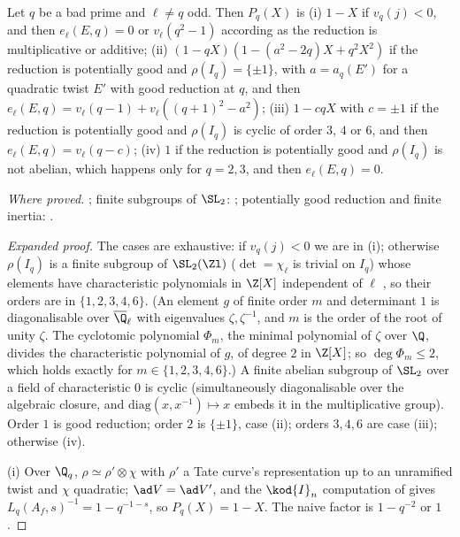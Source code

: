 \begin{sloppypar}
\begin{proposition}\label{prop:paper:shapes}
Let $q$ be a bad prime and $\ell\ne q$ odd. Then $P_q(X)$ is (i) $1-X$ if $v_q(j)<0$, and then $e_\ell(E,q)=0$ or $v_\ell(q^2-1)$ according as the reduction is multiplicative or
additive; (ii) $(1-qX)(1-(a^2-2q)X+q^2X^2)$ if the reduction is potentially good and $\rho(I_q)=\{\pm1\}$, with $a=a_q(E')$ for a quadratic twist $E'$ with good reduction at
$q$, and then $e_\ell(E,q)=v_\ell(q-1)+v_\ell((q+1)^2-a^2)$; (iii) $1-cqX$ with $c=\pm1$ if the reduction is potentially good and $\rho(I_q)$ is cyclic of order $3$, $4$ or $6$, and
then $e_\ell(E,q)=v_\ell(q-c)$; (iv) $1$ if the reduction is potentially good and $\rho(I_q)$ is not abelian, which happens only for $q=2,3$, and then $e_\ell(E,q)=0$.
\end{proposition}

\noindent\emph{Where proved.} ; finite subgroups of $\SL_2$: ; potentially good reduction and finite inertia: .

\begin{proof}[Expanded proof]
The cases are exhaustive: if $v_q(j)<0$ we are in (i); otherwise $\rho(I_q)$ is a finite subgroup of $\SL_2(\Zl)$ ($\det=\chi_\ell$ is trivial on $I_q$) whose elements have
characteristic polynomials in $\Z[X]$ independent of $\ell$ \cite[Section 2]{SerreTate68}, so their orders are in $\{1,2,3,4,6\}$. (An element $g$ of finite order $m$ and determinant $1$ is diagonalisable over
$\overline\Q_\ell$ with eigenvalues $\zeta,\zeta^{-1}$, and $m$ is the order of the root of unity $\zeta$. The cyclotomic polynomial $\Phi_m$, the minimal polynomial of $\zeta$ over $\Q$, divides the
characteristic polynomial of $g$, of degree $2$ in $\Z[X]$; so $\deg\Phi_m\le2$, which holds exactly for $m\in\{1,2,3,4,6\}$.) A finite abelian subgroup of $\SL_2$ over a field of
characteristic $0$ is cyclic (simultaneously diagonalisable over the algebraic closure, and $\mathrm{diag}(x,x^{-1})\mapsto x$ embeds it in the multiplicative group). Order $1$ is good
reduction; order $2$ is $\{\pm1\}$, case (ii); orders $3,4,6$ are case (iii); otherwise (iv).

(i) Over $\Q_q$, $\rho\simeq\rho'\otimes\chi$ with $\rho'$ a Tate curve's representation up to an unramified twist and $\chi$ quadratic; $\ad V=\ad V'$, and the $\kod{I}_n$ computation of
 gives $L_q(A_f,s)^{-1}=1-q^{-1-s}$, so $P_q(X)=1-X$. The naive factor is $1-q^{-2}$ or $1$.


\end{proof}
\end{sloppypar}
